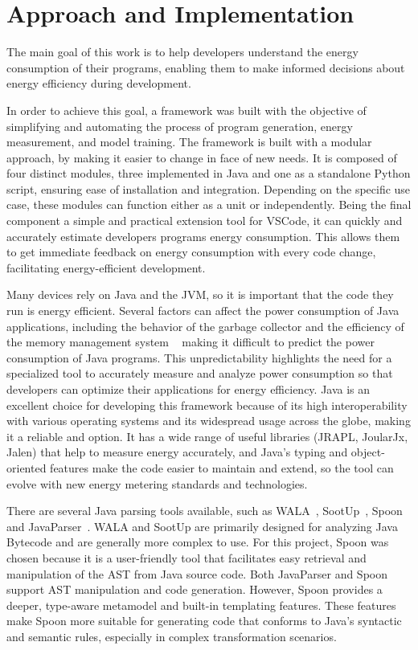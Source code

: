 \chapter{Approach and Implementation}\label{chapter:approach}



The main goal of this work is to help developers understand the energy consumption of their programs, enabling them to make informed decisions about energy efficiency during development.

In order to achieve this goal, a framework was built with the objective of simplifying and automating the process of program generation, energy measurement, and model training. The framework is built with a modular approach, by making it easier to change in face of new needs. It is composed of four distinct modules, three implemented in Java and one as a standalone Python script, ensuring ease of installation and integration. Depending on the specific use case, these modules can function either as a unit or independently. Being the final component a simple and practical extension tool for VSCode, it can quickly and accurately estimate developers programs energy consumption. This allows them to get immediate feedback on energy consumption with every code change, facilitating energy-efficient development.



Many devices rely on Java and the JVM, so it is important that the code they run is energy efficient. Several factors can affect the power consumption of Java applications, including the behavior of the garbage collector and the efficiency of the memory management system ~\cite{10.5555/1267847.1267870} making it difficult to predict the power consumption of Java programs. This unpredictability highlights the need for a specialized tool to accurately measure and analyze power consumption so that developers can optimize their applications for energy efficiency.
Java is an excellent choice for developing this framework because of its high interoperability with various operating systems and its widespread usage across the globe, making it a reliable and option. It has a wide range of useful libraries (JRAPL, JoularJx, Jalen) that help to measure energy accurately, and Java's typing and object-oriented features make the code easier to maintain and extend, so the tool can evolve with new energy metering standards and technologies.

There are several Java parsing tools available, such as WALA~\cite{wala_main}, SootUp~\cite{sootup_main}, Spoon~\cite{spoon_main} and JavaParser~\cite{javaParser}. WALA and SootUp are primarily designed for analyzing Java Bytecode and are generally more complex to use. For this project, Spoon was chosen because it is a user-friendly tool that facilitates easy retrieval and manipulation of the AST from Java source code. Both JavaParser and Spoon support AST manipulation and code generation. However, Spoon provides a deeper, type-aware metamodel and built-in templating features. These features make Spoon more suitable for generating code that conforms to Java’s syntactic and semantic rules, especially in complex transformation scenarios.


